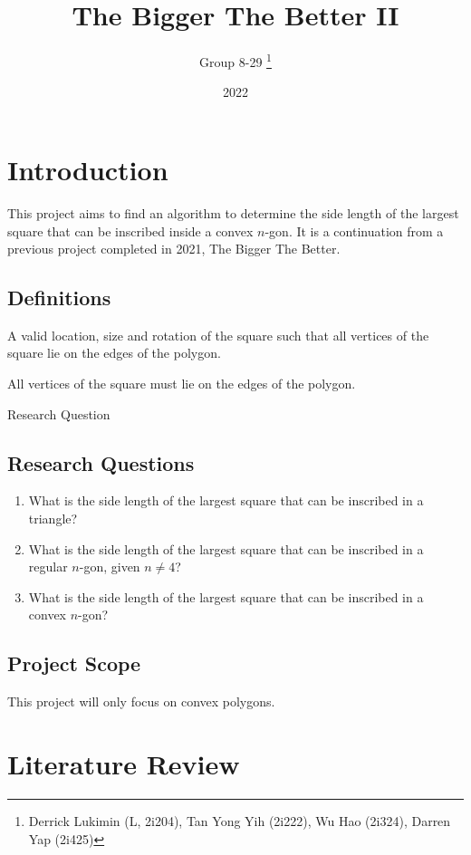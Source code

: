 \documentclass[12pt]{scrartcl}
\title{The Bigger The Better II}
\author{Group 8-29 \thanks{Derrick Lukimin (L, 2i204), Tan Yong Yih (2i222), Wu Hao (2i324), Darren Yap (2i425)}}
\date{2022}
\begin{document}
\onehalfspacing
\maketitle
\tableofcontents

\section{Introduction}
This project aims to find an algorithm to determine
the side length of the largest square that can be
inscribed inside a convex $n$-gon. It is a continuation from
a previous project completed in 2021, The Bigger The Better. \cite{tbtb1}

\subsection{Definitions}
\begin{description}[font=\bfseries, leftmargin=1cm, style=nextline]
\item[placement] A valid location, size and rotation of the square such that
all vertices of the square lie on the edges of the polygon.
\item[inscribed] All vertices of the square must lie on the edges of the polygon.
\item[RQ] Research Question
\end{description}

\subsection{Research Questions}
\begin{enumerate}
	\item What is the side length of the largest square that can be inscribed in a triangle?
	\item What is the side length of the largest square that can be inscribed in a regular $n$-gon, given $n \neq 4$?
	\item What is the side length of the largest square that can be inscribed in a convex $n$-gon?
\end{enumerate}

\subsection{Project Scope}
This project will only focus on convex polygons.

\section{Literature Review}
\end{document}

